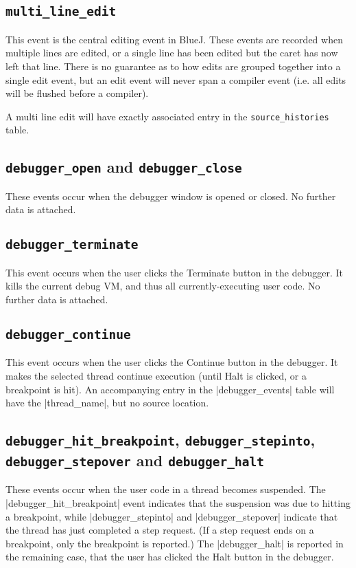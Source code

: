 \documentclass{book}
\begin{document}
\subsection{\texttt{multi\_line\_edit}}

This event is the central editing event in BlueJ.  These events are recorded
when multiple lines are edited, or a single line has been edited but the caret
has now left that line.  There is no guarantee as to how edits are grouped
together into a single edit event, but an edit event will never span a
compiler event (i.e. all edits will be flushed before a compiler).

A multi line edit will have exactly associated entry in the
\texttt{source\_histories} table.

\subsection{\lstinline|debugger_open| and \lstinline|debugger_close|}

These events occur when the debugger window is opened or closed.  No further
data is attached.

\subsection{\lstinline|debugger_terminate|}

This event occurs when the user clicks the Terminate button in the debugger.
It kills the current debug VM, and thus all currently-executing user code.  No
further data is attached.

\subsection{\lstinline|debugger_continue|}

This event occurs when the user clicks the Continue button in the debugger.
It makes the selected thread continue execution (until Halt is clicked, or a
breakpoint is hit).  An accompanying entry in the |debugger_events| table will
have the |thread_name|, but no source location.

\subsection{\lstinline|debugger_hit_breakpoint|,
  \lstinline|debugger_stepinto|, \lstinline|debugger_stepover| and
  \lstinline|debugger_halt|}

These events occur when the user code in a thread becomes suspended.  The
|debugger_hit_breakpoint| event indicates that the suspension was due to
hitting a breakpoint, while |debugger_stepinto| and |debugger_stepover|
indicate that the thread has just completed a step request.  (If a step
request ends on a breakpoint, only the breakpoint is reported.)  The
|debugger_halt| is reported in the remaining case, that the user has
clicked the Halt button in the debugger.
\end{document}
